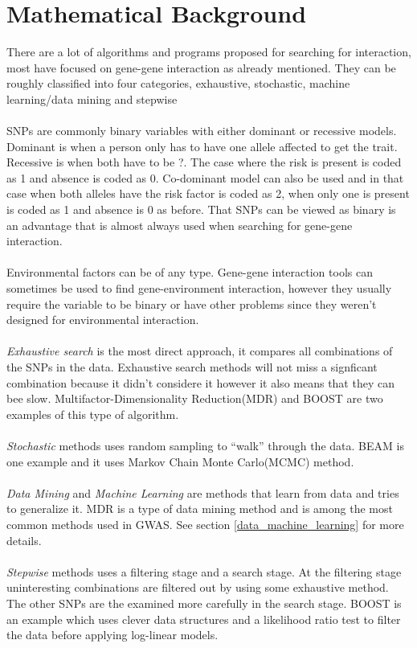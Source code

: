 \documentclass[10pt,a4paper]{report}
\begin{document}
\section{Mathematical Background}
There are a lot of algorithms and programs proposed for searching for interaction, most have focused on gene-gene interaction as already mentioned. They can be roughly classified into four categories, exhaustive, stochastic, machine learning/data mining and stepwise\cite{fast_high_order_cluster}\\
\\
SNPs are commonly binary variables with either dominant or recessive models. Dominant is when a person only has to have one allele affected to get the trait. Recessive is when both have to be ?. The case where the risk is present is coded as 1 and absence is coded as 0. Co-dominant model can also be used and in that case when both alleles have the risk factor is coded as 2, when only one is present is coded as 1 and absence is 0 as before. That SNPs can be viewed as binary is an advantage that is almost always used when searching for gene-gene interaction.\\
\\
Environmental factors can be of any type\cite{gene_enviroment_2013}. Gene-gene interaction tools can sometimes be used to find gene-environment interaction, however they usually require the variable to be binary or have other problems since they weren't designed for environmental interaction.\cite{gene_enviroment_2013}\\
\\
\emph{Exhaustive search} is the most direct approach, it compares all combinations of the SNPs in the data. Exhaustive search methods will not miss a signficant combination because it didn't considere it however it also means that they can bee slow. Multifactor-Dimensionality Reduction(MDR)\cite{mdr_2001} and BOOST\cite{boost_gene_gene} are two examples of this type of algorithm.\\
\\
\emph{Stochastic} methods uses random sampling to ``walk'' through the data. BEAM\cite{beam_2007} is one example and it uses Markov Chain Monte Carlo(MCMC) method.\\
\\
\emph{Data Mining} and \emph{Machine Learning} are methods that learn from data and tries to generalize it. MDR\cite{mdr_2001} is a type of data mining method and is among the most common methods used in GWAS. See section \ref{data_machine_learning} for more details.\\
\\
\emph{Stepwise} methods uses a filtering stage and a search stage. At the filtering stage uninteresting combinations are filtered out by using some exhaustive method. The other SNPs are the examined more carefully in the search stage. BOOST\cite{boost_gene_gene} is an example which uses clever data structures and a likelihood ratio test to filter the data before applying log-linear models.
\end{document}
